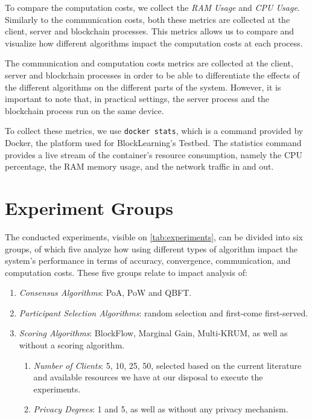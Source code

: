 To compare the computation costs, we collect the \textit{RAM Usage} and \textit{CPU Usage}. Similarly to the communication costs, both these metrics are collected at the client, server and blockchain processes. This metrics allows us to compare and visualize how different algorithms impact the computation costs at each process.

The communication and computation costs metrics are collected at the client, server and blockchain processes in order to be able to differentiate the effects of the different algorithms on the different parts of the system. However, it is important to note that, in practical settings, the server process and the blockchain process run on the same device.

To collect these metrics, we use \texttt{docker stats}, which is a command provided by Docker, the platform used for BlockLearning's Testbed. The statistics command provides a live stream of the container's resource consumption, namely the CPU percentage, the RAM memory usage, and the network traffic in and out.

\section{Experiment Groups}\label{meth:experiments}

The conducted experiments, visible on \autoref{tab:experiments}, can be divided into six groups, of which five analyze how using different types of algorithm impact the system's performance in terms of accuracy, convergence, communication, and computation costs. These five groups relate to impact analysis of:

\begin{enumerate}
    \item \textit{Consensus Algorithms}: PoA, PoW and QBFT.
    
    \item \textit{Participant Selection Algorithms}: random selection and first-come first-served.
    
    \item \textit{Scoring Algorithms}: BlockFlow, Marginal Gain, Multi-KRUM, as well as without a scoring algorithm.
    
        \begin{enumerate}
            \item \textit{Number of Clients}: 5, 10, 25, 50, selected based on the current literature and available resources we have at our disposal to execute the experiments.
    
            \item \textit{Privacy Degrees}: 1 and 5, as well as without any privacy mechanism.
        \end{enumerate}
\end{enumerate}

